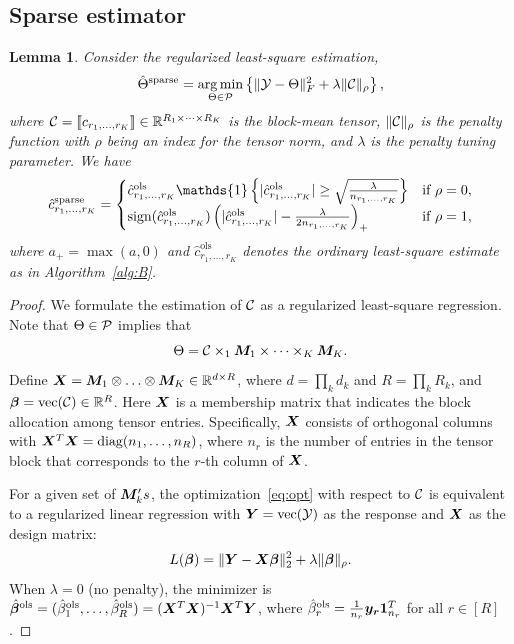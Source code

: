 \documentclass{article}
\newtheorem{lemma}{Lemma}
\begin{document}
\begin{appendices}
\subsection{Sparse estimator}
\begin{lemma}\label{prop:sparse}
Consider the regularized least-square estimation,
\begin{equation}\label{eq:opt}
\hat \Theta^{\text{sparse}}=\operatorname*{arg\,min}_{\Theta\in \mathcal{P}}\left\{\lVert\mathcal{Y}-\Theta\rVert_F^2+\lambda \lVert\mathcal{C}\rVert_\rho
\right\},
\end{equation}
where $\mathcal{C}=\llbracket c_{r_1,\ldots,r_K} \rrbracket\in\mathbb{R}^{R_1\times \cdots\times R_K}$ is the block-mean tensor, $\lVert\mathcal{C}\rVert_\rho$ is the penalty function with $\rho$ being an index for the tensor norm, and $\lambda$ is the penalty tuning parameter. We have
\begin{equation}\label{eq:lasso}
\hat c^{\text{sparse}}_{r_1,\ldots,r_K}=
\begin{cases}
\hat c^{\text{ols}}_{r_1,\ldots,r_K}\mathds{1}\left\{|\hat c^{\text{ols}}_{r_1,\ldots,r_K} |\geq {\sqrt{\lambda \over n_{r_1,\ldots,r_K}}}\right\} & \text{if}\ \rho=0,\\
\text{sign}(\hat c^{\text{ols}}_{r_1,\ldots,r_K})\left( |\hat c^{\text{ols}}_{r_1,\ldots,r_K}|-{\lambda \over 2n_{r_1,\ldots,r_K}}  \right)_{+} &\text{if}\ \rho=1,
\end{cases}
\end{equation}
where $a_{+}=\max(a,0)$ and $\hat c^{\text{ols}}_{r_1,\ldots,r_K}$ denotes the ordinary least-square estimate as in Algorithm~\ref{alg:B}. 
\end{lemma}

\begin{proof}
We formulate the estimation of $\mathcal{C}$ as a regularized least-square regression. Note that $\Theta\in\mathcal{P}$ implies that
\[
\Theta=\mathcal{C}\times_1\bm M_1\times \cdots \times_K \bm M_K.
\]
Define $\bm X=\bm M_1\otimes \ldots \otimes \bm M_K\in \mathbb{R}^{d\times R}$, where $d=\prod_k d_k$ and $R=\prod_k R_k$, and ${\bm \beta}=\text{vec}(\mathcal{C})\in\mathbb{R}^R$. Here $\bm X$ is a membership matrix that indicates the block allocation among tensor entries. Specifically, $\bm X$ consists of orthogonal columns with $\bm X^T\bm X=\text{diag}(n_1,\ldots,n_R)$, where $n_r$ is the number of entries in the tensor block that corresponds to the $r$-th column of $\bm X$.

For a given set of $\bm M_k's$, the optimization~\eqref{eq:opt} with respect to $\mathcal{C}$ is equivalent to a regularized linear regression with $\bm Y=\text{vec}(\mathcal{Y})$ as the response and $\bm X$ as the design matrix:
\begin{equation}\label{eq:opt}
L({\bm \beta})=\lVert\bm Y-\bm X \bm{\beta}\rVert_2^2+\lambda\lVert\bm{\beta}\rVert_\rho.
\end{equation}
When $\lambda=0$ (no penalty), the minimizer is $\hat {\bm \beta}^{\text{ols}}=(\hat \beta^{\text{ols}}_1,\ldots,\hat \beta^{\text{ols}}_R)=(\bm X^T\bm X)^{-1}\bm X^T\bm Y$, where $\hat \beta^{\text{ols}}_r={1\over n_r}\bm{y}_{\bm{r}}\mathbf{1}^T_{n_r}$ for all $r\in[R]$.


\end{proof}
\end{appendices}
\end{document}
